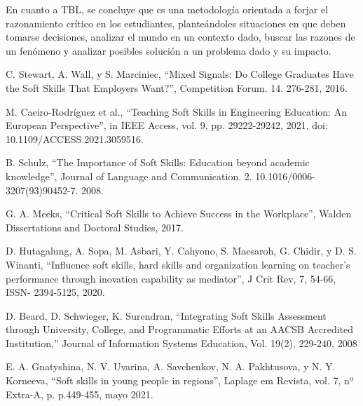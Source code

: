 \documentclass[conference]{IEEEtran}
\begin{document}
En cuanto a TBL, se concluye que es una metodología orientada a forjar el razonamiento crítico en los estudiantes, planteándoles situaciones en que deben tomarse decisiones, analizar el mundo en un contexto dado, buscar las razones de un fenómeno y analizar posibles solución a un problema dado y su impacto.

\begin{thebibliography}{00}

 C. Stewart, A. Wall, y S. Marciniec, ``Mixed Signals: Do College Graduates Have the Soft Skills That Employers Want?'', Competition Forum. 14. 276-281, 2016.

 M. Caeiro-Rodríguez et al., ``Teaching Soft Skills in Engineering Education: An European Perspective'', in IEEE Access, vol. 9, pp. 29222-29242, 2021, doi: 10.1109/ACCESS.2021.3059516.

 B. Schulz, ``The Importance of Soft Skills: Education beyond academic knowledge'', Journal of Language and Communication. 2. 10.1016/0006-3207(93)90452-7. 2008.
% 

 G. A. Meeks, ``Critical Soft Skills to Achieve Success in the Workplace'',  Walden Dissertations and Doctoral Studies, 2017.

 D. Hutagalung, A. Sopa, M. Asbari, Y. Cahyono, S. Maesaroh, G. Chidir, y D. S. Winanti, ``Influence soft skills, hard skills and organization learning on teacher’s performance through inovation capability as mediator'', J Crit Rev, 7, 54-66, ISSN- 2394-5125, 2020.

 D. Beard, D. Schwieger, K. Surendran, ``Integrating Soft Skills Assessment through University, College, and Programmatic Efforts at an AACSB Accredited Institution,'' Journal of Information Systems Education, Vol. 19(2), 229-240, 2008
% 

 E. A. Gnatyshina, N. V. Uvarina, A. Savchenkov, N. A. Pakhtusova, y N. Y. Korneeva, ``Soft skills in young people in regions'', Laplage em Revista, vol. 7, nº Extra-A, p. p.449-455, mayo 2021.


\end{thebibliography}
\end{document}
